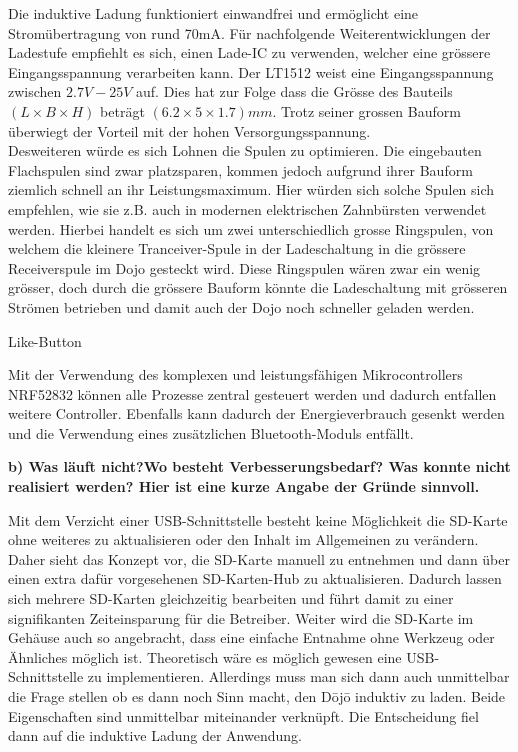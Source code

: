 Die induktive Ladung funktioniert einwandfrei und ermöglicht eine Stromübertragung von rund 70mA. Für nachfolgende Weiterentwicklungen der Ladestufe empfiehlt es sich, einen Lade-IC zu verwenden, welcher eine grössere Eingangsspannung verarbeiten kann. Der LT1512 weist eine Eingangsspannung zwischen $2.7V - 25V$ auf. Dies hat zur Folge dass die Grösse des Bauteils $(L \times B \times H)$ beträgt $(6.2\times 5\times 1.7)mm$. Trotz seiner grossen Bauform überwiegt der Vorteil mit der hohen Versorgungsspannung.\\
Desweiteren würde es sich Lohnen die Spulen zu optimieren. Die eingebauten Flachspulen sind zwar platzsparen, kommen jedoch aufgrund ihrer Bauform ziemlich schnell an ihr Leistungsmaximum. Hier würden sich solche Spulen sich empfehlen, wie sie z.B. auch in modernen elektrischen Zahnbürsten verwendet werden. Hierbei handelt es sich um zwei unterschiedlich grosse Ringspulen, von welchem die kleinere Tranceiver-Spule in der Ladeschaltung in die grössere Receiverspule  im Dojo gesteckt wird. Diese Ringspulen wären zwar ein wenig grösser, doch durch die grössere Bauform könnte die Ladeschaltung mit grösseren Strömen betrieben und damit auch der Dojo noch schneller geladen werden.
 
Like-Button
 
Mit der Verwendung des komplexen und leistungsfähigen Mikrocontrollers NRF52832 können alle Prozesse zentral gesteuert werden und dadurch entfallen weitere Controller. Ebenfalls kann dadurch der Energieverbrauch gesenkt werden und die Verwendung eines zusätzlichen Bluetooth-Moduls entfällt.
 
\textbf{b) Was läuft nicht?Wo besteht Verbesserungsbedarf? Was konnte nicht realisiert werden? Hier ist eine kurze Angabe der Gründe sinnvoll.}
 
Mit dem Verzicht einer USB-Schnittstelle besteht keine Möglichkeit die SD-Karte ohne weiteres zu aktualisieren oder den Inhalt im Allgemeinen zu verändern. Daher sieht das Konzept vor, die SD-Karte manuell zu entnehmen und dann über einen extra dafür vorgesehenen SD-Karten-Hub zu aktualisieren. Dadurch lassen sich mehrere SD-Karten gleichzeitig bearbeiten und führt damit zu einer signifikanten Zeiteinsparung für die Betreiber. Weiter wird die SD-Karte im Gehäuse auch so angebracht, dass eine einfache Entnahme ohne Werkzeug oder Ähnliches möglich ist. Theoretisch wäre es möglich gewesen eine USB-Schnittstelle zu implementieren. Allerdings muss man sich dann auch unmittelbar die Frage stellen ob es dann noch Sinn macht, den Dōjō induktiv zu laden. Beide Eigenschaften sind unmittelbar miteinander verknüpft. Die Entscheidung fiel dann auf die induktive Ladung der Anwendung.
 
